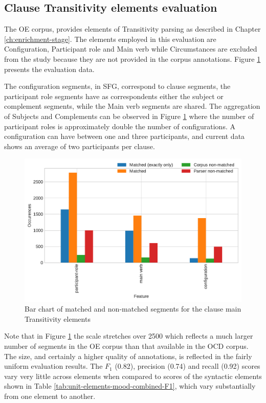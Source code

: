 \subsection{Clause Transitivity elements evaluation}
\label{sec:unit-transitivity-element-evaluation}

    The OE corpus, provides elements of Transitivity parsing as described in Chapter \ref{ch:enrichment-stage}. The elements employed in this evaluation are Configuration, Participant role and Main verb while Circumstances are excluded from the study because they are not provided in the corpus annotations. Figure \ref{fig:unit-elements-transitivity-data} presents the evaluation data. 
    
    The configuration segments, in SFG, correspond to clause segments, the participant role segments have as correspondents either the subject or complement segments, while the Main verb segments are shared. The aggregation of Subjects and Complements can be observed in Figure \ref{fig:unit-elements-transitivity-data} where the number of participant roles is approximately double the number of configurations. A configuration can have between one and three participants, and current data shows an average of two participants per clause. 
    
    \begin{figure}[!ht]
    \centering
    \includegraphics[width=.85\textwidth]{evaluation-results/figures/unit-elements-transitivity-data.pdf}
    \caption{Bar chart of matched and non-matched segments for the clause main Transitivity elements}
    \label{fig:unit-elements-transitivity-data}
    \end{figure}
    
    Note that in Figure \ref{fig:unit-elements-transitivity-data} the scale stretches over 2500 which reflects a much larger number of segments in the OE corpus than that available in the OCD corpus. The size, and certainly a higher quality of annotations, is reflected in the fairly uniform evaluation results. The $F_1$ (0.82), precision (0.74) and recall (0.92) scores vary very little across elements when compared to scores of the syntactic elements shown in Table \ref{tab:unit-elements-mood-combined-F1},  which vary substantially from one element to another.   

